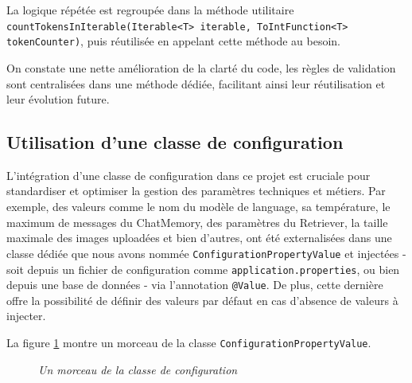 \documentclass[12pt,a4paper]{report}
\begin{document}
	La logique répétée est regroupée dans la méthode utilitaire \\ \verb|countTokensInIterable(Iterable<T> iterable, ToIntFunction<T> tokenCounter)|, puis réutilisée en appelant cette méthode au besoin.
	
	On constate une nette amélioration de la clarté du code, les règles de validation sont centralisées dans une méthode dédiée, facilitant ainsi leur réutilisation et leur évolution future.
	
	\subsection{Utilisation d'une classe de configuration}
	
	L’intégration d’une classe de configuration dans ce projet est cruciale pour standardiser et optimiser la gestion des paramètres techniques et métiers. Par exemple, des valeurs comme le nom du modèle de language, sa température, le maximum de messages du ChatMemory, des paramètres du Retriever, la taille maximale des images uploadées et bien d'autres, ont été externalisées dans une classe dédiée que nous avons nommée \verb|ConfigurationPropertyValue| et injectées - soit depuis un fichier de configuration comme \verb|application.properties|, ou bien depuis une base de données - via l'annotation \verb|@Value|. De plus, cette dernière offre la possibilité de définir des valeurs par défaut en cas d'absence de valeurs à injecter.
	
	La figure \ref{fig:configuration-property-value} montre un morceau de la classe \verb|ConfigurationPropertyValue|.
	
	\begin{figure}[H]
		\centering
		\caption{\textit{Un morceau de la classe de configuration}}
		\label{fig:configuration-property-value}
	\end{figure}
	
\end{document}
